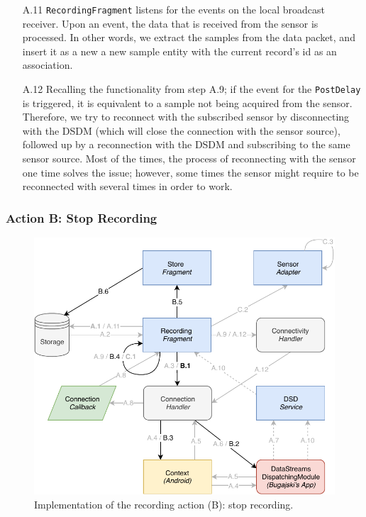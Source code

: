 \begin{itemize}
    \item[A.11] \verb|RecordingFragment| listens for the events on the local broadcast receiver. Upon an event, the data that is received from the sensor is processed. In other words, we extract the samples from the data packet, and insert it as a new a new sample entity with the current record's id as an association. 
    \item[A.12] Recalling the functionality from step A.9; if the event for the \verb|PostDelay| is triggered, it is equivalent to a sample not being acquired from the sensor. Therefore, we try to reconnect with the subscribed sensor by disconnecting with the DSDM (which will close the connection with the sensor source), followed up by a reconnection with the DSDM and subscribing to the same sensor source. Most of the times, the process of reconnecting with the sensor one time solves the issue; however, some times the sensor might require to be reconnected with several times in order to work. 
\end{itemize}

\subsubsection{Action B: Stop Recording}
\begin{figure}
    \centering
    \includegraphics[scale=0.7]{images/Recording_ImpB.pdf}
    \caption{Implementation of the recording action (B): stop recording.}
    \label{fig:impl_recordingB}
\end{figure}

